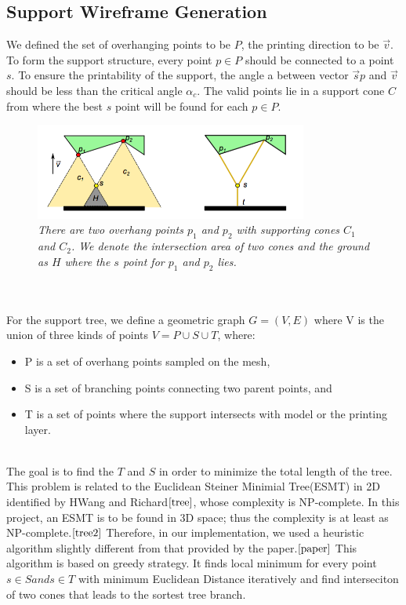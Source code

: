 \documentclass[11pt, a4paper]{article}
\begin{document}
	\subsection{Support Wireframe Generation}
	We defined the set of overhanging points to be $P$, the printing direction to be $\vec{v}$. To form the support structure, every point ${p}\in{P}$ should be connected to a point $s$. To ensure the printability of the support, the angle a between vector $\vec{s}p$ and $\vec{v}$ should be less than the critical angle $\alpha_{c}$. The valid points lie in a support cone $C$ from where the best $s$ point will be found for each ${p}\in{P}$. 
	\begin{figure}[!ht]
  		\centering
      	\includegraphics[width=0.8\textwidth]{Figure_4.png}
  	\caption{\textit{There are two overhang points $p_1$ and $p_2$ with supporting cones $C_1$ and $C_2$. We denote the intersection area of two cones and the ground as $H$ where the $s$ point for $p_1$ and $p_2$ lies.}}
	\end{figure}
	~\\~\\For the support tree, we define a geometric graph $G=(V,E)$ where V is the union of three kinds of points $V={P}\cup{S}\cup{T}$, where:
	\begin{itemize}
	\item P is a set of overhang points sampled on the mesh,
	\item S is a set of branching points connecting two parent points, and
	\item T is a set of points where the support intersects with model or the printing layer.
	\end{itemize}
	
	~\\The goal is to find the $T$ and $S$ in order to minimize the total length of the tree. This problem is related to the Euclidean Steiner Minimial Tree(ESMT) in 2D identified by HWang and Richard$\cite{tree}$, whose complexity is NP-complete. In this project, an ESMT is to be found in 3D space; thus the complexity is at least as NP-complete.$\cite{tree2}$ Therefore, in our implementation, we used a heuristic algorithm slightly different from that provided by the paper.$\cite{paper}$ This algorithm is based on greedy strategy. It finds local minimum for every point ${s}\in{S} and {s}\in{T}$ with minimum Euclidean Distance iteratively and find interseciton of two cones that leads to the sortest tree branch.
\end{document}
